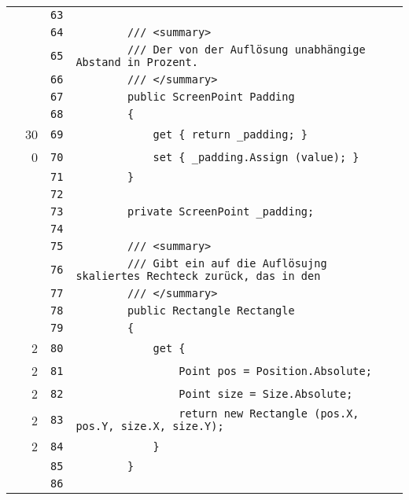 \documentclass[a4paper,10pt]{article}
\begin{document}
\begin{longtable}[l]{lrrl}
\cellcolor{gray} &  & \verb~63~ & \verb~~\\
\cellcolor{gray} &  & \verb~64~ & \verb~        /// <summary>~\\
\cellcolor{gray} &  & \verb~65~ & \verb~        /// Der von der Auflösung unabhängige Abstand in Prozent.~\\
\cellcolor{gray} &  & \verb~66~ & \verb~        /// </summary>~\\
\cellcolor{gray} &  & \verb~67~ & \verb~        public ScreenPoint Padding~\\
\cellcolor{gray} &  & \verb~68~ & \verb~        {~\\
\cellcolor{green} & 30 & \verb~69~ & \verb~            get { return _padding; }~\\
\cellcolor{red} & 0 & \verb~70~ & \verb~            set { _padding.Assign (value); }~\\
\cellcolor{gray} &  & \verb~71~ & \verb~        }~\\
\cellcolor{gray} &  & \verb~72~ & \verb~~\\
\cellcolor{gray} &  & \verb~73~ & \verb~        private ScreenPoint _padding;~\\
\cellcolor{gray} &  & \verb~74~ & \verb~~\\
\cellcolor{gray} &  & \verb~75~ & \verb~        /// <summary>~\\
\cellcolor{gray} &  & \verb~76~ & \verb~        /// Gibt ein auf die Auflösujng skaliertes Rechteck zurück, das in den~\\
\cellcolor{gray} &  & \verb~77~ & \verb~        /// </summary>~\\
\cellcolor{gray} &  & \verb~78~ & \verb~        public Rectangle Rectangle~\\
\cellcolor{gray} &  & \verb~79~ & \verb~        {~\\
\cellcolor{green} & 2 & \verb~80~ & \verb~            get {~\\
\cellcolor{green} & 2 & \verb~81~ & \verb~                Point pos = Position.Absolute;~\\
\cellcolor{green} & 2 & \verb~82~ & \verb~                Point size = Size.Absolute;~\\
\cellcolor{green} & 2 & \verb~83~ & \verb~                return new Rectangle (pos.X, pos.Y, size.X, size.Y);~\\
\cellcolor{green} & 2 & \verb~84~ & \verb~            }~\\
\cellcolor{gray} &  & \verb~85~ & \verb~        }~\\
\cellcolor{gray} &  & \verb~86~ & \verb~~\\

\end{longtable}
\end{document}
